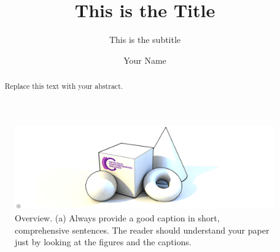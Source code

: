 \title{This is the Title}

\subtitle{This is the subtitle}


\repdate{\today}


%
\author[IVC]{Your Name}

%
\newcommand{\TUGn}{Graz University of Technology}
\address[IVC]{Institute of Visual Computing \\ \TUGn, Austria}


%

\begin{abstract}

Replace this text with your abstract. 

\end{abstract}



\begin{figure}[t]
    \centering
    \includegraphics[width=\textwidth]{figures/figure_template.png}
    \caption{Overview. (a) Always provide a good caption in short, comprehensive sentences. The reader should understand your paper just by looking at the figures and the captions.}
\label{fig:overview}
\end{figure}

